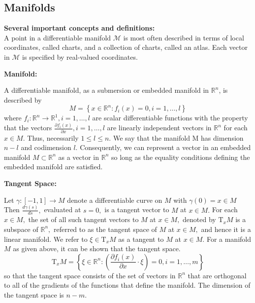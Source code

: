 \documentclass[13pt]{article}
\theoremstyle{definition}
\newcommand{\bm}{\textbf}
\begin{document}
\subsection{Manifolds}
\bm{Several important concepts and definitions:}\\

A point in a differentiable manifold $\mathcal{M}$ is most often described in terms of
local coordinates, called charts, and a collection of charts, called an atlas.
Each vector in $\mathcal{M}$ is specified by real-valued coordinates.

\bm{Manifold:}

A differentiable manifold, as a submersion or embedded manifold in $\mathbb{R}^n$,
is described by
\begin{equation}
M=\left\{x \in \mathbb{R}^{n}: f_{i}(x)=0, i=1, \dots, l\right\}
\end{equation}
where $f_{i}: \mathbb{R}^{n} \rightarrow \mathbb{R}^{1}, i=1, \ldots, l$ are scalar differentiable functions with the property that the vectors $\frac{\partial f_{i}(x)}{\partial x}, i=1, \ldots, l$ are linearly independent vectors in $\mathbb{R}^{n}$ for each $x \in M .$ Thus, necessarily $1 \leq l \leq n .$ We say that the manifold
M has dimension $n − l$ and codimension $l$. Consequently, we can represent a vector in an embedded manifold $M \subset \mathbb{R}^{n}$ as a vector in $\mathbb{R}^{n}$ so long as the equality conditions defining the embedded manifold are satisfied.

\bm{Tangent Space:}

Let $\gamma:[-1,1] \rightarrow M$ denote a differentiable curve on $M$ with $\gamma(0)=x \in M$ Then $\frac{d \gamma(s)}{d s},$ evaluated at $s=0,$ is a tangent vector to $M$ at $x \in M .$ For each $x \in M,$ the set of all such tangent vectors to $M$ at $x \in M,$ denoted by $\mathrm{T}_{x} M$ is a subspace of $\mathbb{R}^{n},$ referred to as the tangent space of $M$ at $x \in M,$ and hence it is a linear manifold. We refer to $\xi \in \mathrm{T}_{x} M$ as a tangent to $M$ at $x \in M .$ For a manifold $M$ as given above, it can be shown that the tangent space.
\begin{equation}
\mathrm{T}_{x} M=\left\{\xi \in \mathbb{R}^{n}:\left(\frac{\partial f_{i}(x)}{\partial x} \cdot \xi\right)=0, i=1, \ldots, m\right\}
\end{equation}
so that the tangent space consists of the set of vectors in $\mathbb{R}^{n}$ that are orthogonal to all of the gradients of the functions that define the manifold. The dimension of the tangent space is $n-m$.
\end{document}

